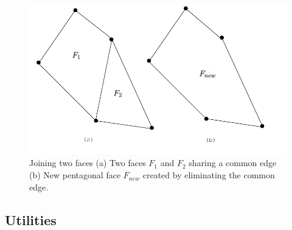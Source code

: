\documentclass[12pt]{article}
\begin{document}
\begin{figure}[!h]
  \begin{center}
    \includegraphics[scale=1.0]{figures/MFs_Join}
    
    \caption{Joining two faces (a) Two faces $F_1$ and $F_2$ sharing a
      common edge (b) New pentagonal face $F_{new}$ created by
      eliminating the common edge.  }
    \label{fig:MFs_Join}
  \end{center}
\end{figure}

\newpage
\subsection{Utilities}
  
\end{document}
